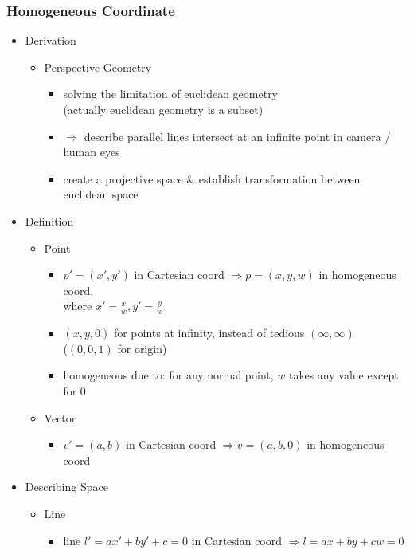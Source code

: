 \subsubsection{Homogeneous Coordinate}
\begin{itemize}
\item Derivation
	\begin{itemize}
	\item Perspective Geometry
		\begin{itemize}
		\item solving the limitation of euclidean geometry \\
		(actually euclidean geometry is a subset)
		\item $\Rightarrow$ describe parallel lines intersect at an infinite point in camera / human eyes
		\item create a projective space \& establish transformation between euclidean space
		\end{itemize}
	\end{itemize}
\item Definition
	\begin{itemize}
	\item Point
		\begin{itemize}
		\item $p'=(x',y')$ in Cartesian coord $\Rightarrow p=(x,y,w)$ in homogeneous coord, \\
		where $x' = \frac {x} w, y' = \frac {y} w$
		\item $(x,y, 0)$ for points at infinity, instead of tedious $(\infty,\infty)$ \\
		($(0,0,1)$ for origin)
		\item homogeneous due to: for any normal point, $w$ takes any value except for $0$
		\end{itemize}
	\item Vector
		\begin{itemize}
		\item $v'=(a,b)$ in Cartesian coord $\Rightarrow v=(a,b,0)$ in homogeneous coord
		\end{itemize}
	\end{itemize}
\item Describing Space
	\begin{itemize}
	\item Line
		\begin{itemize}
		\item line $l'=ax'+by'+c = 0$ in Cartesian coord $\Rightarrow l=ax + by + cw = 0$ \\

\end{itemize}
\end{itemize}
\end{itemize}
